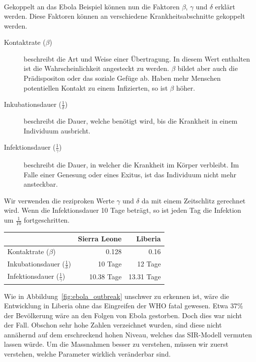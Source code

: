 \begin{refsection}
\[\begin{array}{rccrcrcr}
 \end{array}
\]
Gekoppelt an das Ebola Beispiel können nun die Faktoren $\beta$, $\gamma$ und $\delta$ erklärt werden. Diese Faktoren können an verschiedene Krankheitsabschnitte gekoppelt werden.
\begin{description}
  \item [Kontaktrate ($\beta$)] beschreibt die Art und Weise einer Übertragung. In diesem Wert enthalten ist die Wahrscheinlichkeit angesteckt zu werden. $\beta$ bildet aber auch die Prädispositon oder das soziale Gefüge ab. Haben mehr Menschen potentiellen Kontakt zu einem Infizierten, so ist $\beta$ höher.
%
  \item [Inkubationsdauer ($\frac{1}{\delta}$)] beschreibt die Dauer, welche benötigt wird, bis die Krankheit in einem Individuum ausbricht.
%
  \item [Infektionsdauer ($\frac{1}{\gamma}$)] beschreibt die Dauer, in welcher die Krankheit im Körper verbleibt. Im Falle einer Genesung oder eines Exitus, ist das Individuum nicht mehr ansteckbar. 
%
\end{description}
Wir verwenden die reziproken Werte $\gamma$ und $\delta$ da mit einem Zeitschlitz gerechnet wird. Wenn die Infektionsdauer 10 Tage beträgt, so ist jeden Tag die Infektion um $\frac{1}{10}$ fortgeschritten.
\begin{table}[h]
\centering
\begin{tabular}{ l r r }
						& Sierra Leone & Liberia \\
						\hline
  Kontaktrate ($\beta$) & 0.128 & 0.16 \\
  Inkubationsdauer ($\frac{1}{\delta}$) & 10 Tage & 12 Tage \\
  Infektionsdauer ($\frac{1}{\gamma}$) & 10.38 Tage & 13.31 Tage \\
\end{tabular}
\end{table}
Wie in Abbildung~\ref{fig:ebola_outbreak} unschwer zu erkennen ist, wäre die Entwicklung in Liberia ohne das Eingreifen der WHO fatal gewesen. Etwa 37\% der Bevölkerung wäre an den Folgen von Ebola gestorben. Doch dies war nicht der Fall. Obschon sehr hohe Zahlen verzeichnet wurden, sind diese nicht annähernd auf dem erschreckend hohen Niveau, welches das SIR-Modell vermuten lassen würde. Um die Massnahmen besser zu verstehen, müssen wir zuerst verstehen, welche Parameter wirklich veränderbar sind.


\end{refsection}
